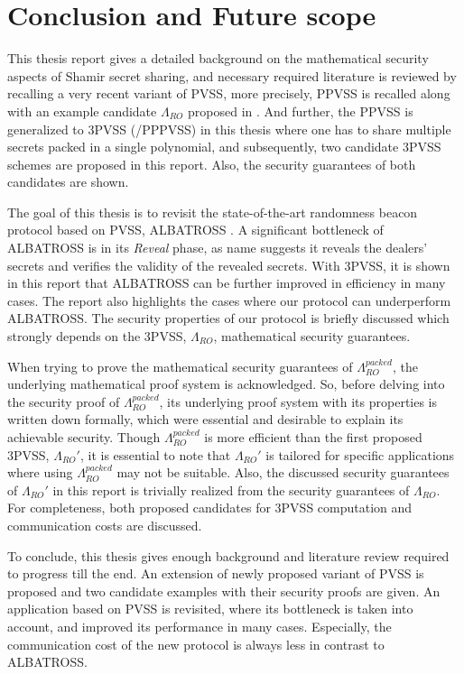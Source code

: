 \chapter{Conclusion and Future scope}
\label{cha:conclusion}
This thesis report gives a detailed background on the mathematical security aspects of 
Shamir secret sharing, and necessary required literature is reviewed by recalling a 
very recent variant of PVSS, more precisely, PPVSS is recalled along with an example 
candidate $\Lambda_{RO}$ proposed in \cite{cryptoeprint:2025/576}. And further, the PPVSS is generalized 
to 3PVSS (/PPPVSS) in this thesis where one has to share multiple 
secrets packed in a single polynomial, and subsequently, two candidate 3PVSS schemes 
are proposed in this report. Also, the security guarantees of both candidates are shown.\par

The goal of this thesis is to revisit the state-of-the-art randomness beacon protocol 
based on PVSS, ALBATROSS \cite{cryptoeprint:2020/644}. A significant bottleneck of 
ALBATROSS is in its \textit{Reveal} phase, as name suggests it reveals the dealers' secrets 
and verifies the validity of the revealed secrets. With 3PVSS, it is shown in this 
report that ALBATROSS can be further improved in efficiency in many cases. The report 
also highlights the cases where our protocol can underperform ALBATROSS. The security 
properties of our protocol is briefly discussed which strongly depends on the 3PVSS, 
$\Lambda_{RO}$, mathematical security guarantees.\par

When trying to prove the mathematical security guarantees of $\Lambda_{RO}^{packed}$,  
the underlying mathematical proof system is acknowledged. So, before delving into the 
security proof of $\Lambda_{RO}^{packed}$, its underlying proof system with its properties 
is written down formally, which were essential and desirable to explain its 
achievable security. Though $\Lambda_{RO}^{packed}$ is more efficient than the first 
proposed 3PVSS, $\Lambda_{RO}'$, it is essential to note that $\Lambda_{RO}'$ is tailored 
for specific applications where using $\Lambda_{RO}^{packed}$ may not be suitable. Also, 
the discussed security guarantees of $\Lambda_{RO}'$ in this report is trivially 
realized from the security guarantees of $\Lambda_{RO}$. For completeness, both proposed candidates 
for 3PVSS computation and communication costs are discussed.\par

To conclude, this thesis gives enough background and literature review required to 
progress till the end. An extension of newly proposed variant of PVSS is proposed and 
two candidate examples with their security proofs are given. An application based on PVSS 
is revisited, where its bottleneck is taken into account, and improved its performance 
in many cases. Especially, the communication cost of the new protocol is always less in 
contrast to ALBATROSS.


